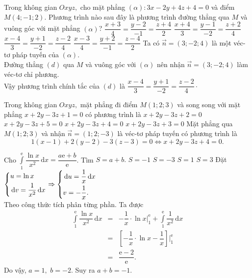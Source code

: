 \begin{ex}%
Trong không gian $ Oxyz, $	 cho mặt phẳng $ (\alpha)\colon 3x-2y+4z+4=0 $ và điểm $ M(4;-1;2) $. Phương trình nào sau đây là phương trình đường thẳng qua $ M $ và vuông góc với mặt phẳng $ (\alpha) $?
	\choice
	{$ \dfrac{x+3}{4}=\dfrac{y-2}{-1}=\dfrac{z+4}{2} $}
	{$ \dfrac{x+4}{3}=\dfrac{y-1}{-2}=\dfrac{z+2}{4} $}
	{\True $ \dfrac{x-4}{3}=\dfrac{y+1}{-2}=\dfrac{z-2}{4} $}
	{$ \dfrac{x-3}{4}=\dfrac{y+2}{-1}=\dfrac{z-4}{2} $}
	\loigiai
	{Ta có $ \vec{n}=(3;-2;4) $ là một véc-tơ pháp tuyến của $ (\alpha) $.\\
	Đường thẳng $ (d) $ qua $ M $ và vuông góc với $ (\alpha) $ nên nhận $ \vec{n}=(3;-2;4) $ làm véc-tơ chỉ phương.\\
	Vậy phương trình chính tắc của $ (d) $ là $ \dfrac{x-4}{3}=\dfrac{y+1}{-2}=\dfrac{z-2}{4} \cdot $
	}
\end{ex}
\begin{ex}%
Trong không gian $ Oxyz, $	 mặt phẳng  đi điểm $ M(1;2;3) $ và song song với mặt phẳng $ x+2y-3z+1=0 $ có phương trình là
	\choice
	{$ x+2y-3z+2=0 $}
	{$ x+2y-3z+5=0 $}
	{\True $ x+2y-3z+4=0 $}
	{$ x+2y-3z+3=0 $}
	\loigiai
	{Mặt phẳng qua $ M(1;2;3) $ và nhận $ \vec{n}=(1;2;-3) $ là véc-tơ pháp tuyến có phương trình là $$ 1(x-1)+2(y-2)-3(z-3)=0 \Leftrightarrow  x+2y-3z+4=0. $$
	}
\end{ex}
\begin{ex}%
Cho $ \displaystyle \int \limits_{1}^{\mathrm{e}}\dfrac{\ln x}{x^2} \mathrm{\,d}x=\dfrac{a \mathrm{e}+b}{\mathrm{e}} $. Tìm $ S=a+b. $	
	\choice
	{\True $ S=-1 $}
	{$ S=-3 $}
	{$ S=1 $}
	{$ S=3 $}
	\loigiai
	{Đặt $ \left\{\begin{aligned}&u=\ln x\\&\mathrm{\,d}v=\dfrac{1}{x^2} \mathrm{\,d}x\end{aligned}\right. \Rightarrow \left\{\begin{aligned}&\mathrm{\,d}u=\dfrac{1}{x}\mathrm{\,d}x\\&v=-\dfrac{1}{x}.\end{aligned}\right.$\\
	Theo công thức tích phân từng phần.	Ta được
\begin{eqnarray*}
\displaystyle \int \limits_{1}^{\mathrm{e}}\dfrac{\ln x}{x^2} \mathrm{\,d}x&=&-\dfrac{1}{x} \cdot \ln x \big|_1^{\mathrm{e}} + \int\limits_{1}^{\mathrm{e}} \dfrac{1}{x^2} \mathrm{\,d}x\\
&=&\left[-\dfrac{1}{x}\cdot \ln x - \dfrac{1}{x}\right]\bigg|_1^{\mathrm{e}}\\
&=&\dfrac{\mathrm{e}-2}{\mathrm{e}}.
\end{eqnarray*}
Do vậy, $ a = 1, $ $ b=-2 $. Suy ra $ a+b=-1. $
}
\end{ex}
